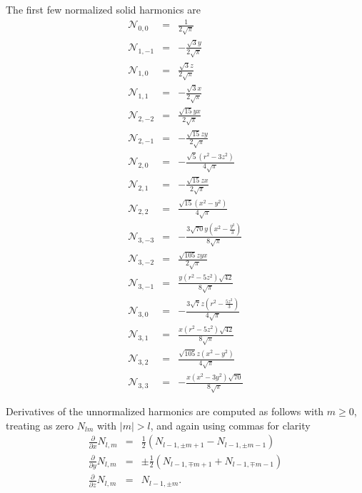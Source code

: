 \documentclass[12pt]{article}
\newcommand{\N}{\mathcal{N}}
\begin{document}
The first few normalized solid harmonics are
\begin{eqnarray}
\N_{0, 0} & = &  \frac{1}{2 \sqrt{\pi}}  \nonumber \\
\N_{1, -1} & = &  -\frac{\sqrt{3} y}{2 \sqrt{\pi}} \nonumber \\
\N_{1, 0} & = &  \frac{\sqrt{3} z}{2 \sqrt{\pi}} \nonumber \\
\N_{1, 1} & = &  -\frac{\sqrt{3} x}{2 \sqrt{\pi}} \nonumber \\
\N_{2, -2} & = &  \frac{\sqrt{15} y x}{2 \sqrt{\pi}} \nonumber \\
\N_{2, -1} & = &  -\frac{\sqrt{15} z y}{2 \sqrt{\pi}} \nonumber \\
\N_{2, 0} & = &  -\frac{\sqrt{5} \left(r^{2}-3 z^{2}\right)}{4 \sqrt{\pi}} \nonumber \\
\N_{2, 1} & = &  -\frac{\sqrt{15} z x}{2 \sqrt{\pi}} \nonumber \\
\N_{2, 2} & = &  \frac{\sqrt{15} \left(x^{2}-y^{2}\right)}{4 \sqrt{\pi}} \nonumber \\
\N_{3, -3} & = &  -\frac{3 \sqrt{70} y \left(x^{2}-\frac{y^{2}}{3}\right)}{8 \sqrt{\pi}} \nonumber \\
\N_{3, -2} & = &  \frac{\sqrt{105} z y x}{2 \sqrt{\pi}} \nonumber \\
\N_{3, -1} & = &  \frac{y \left(r^{2}-5 z^{2}\right) \sqrt{42}}{8 \sqrt{\pi}} \nonumber \\
\N_{3, 0} & = &  -\frac{3 \sqrt{7} z \left(r^{2}-\frac{5 z^{2}}{3}\right)}{4 \sqrt{\pi}}  \nonumber \\
\N_{3, 1} & = &  \frac{x \left(r^{2}-5 z^{2}\right) \sqrt{42}}{8 \sqrt{\pi}} \nonumber \\
\N_{3, 2} & = &  \frac{\sqrt{105} z \left(x^{2}-y^{2}\right)}{4 \sqrt{\pi}} \nonumber \\
\N_{3, 3} & = &  -\frac{x \left(x^{2}-3 y^{2}\right) \sqrt{70}}{8 \sqrt{\pi}} \nonumber
\end{eqnarray}

Derivatives of the unnormalized harmonics are computed as follows with $m\ge 0$, treating as zero $N_{lm}$ with $|m|>l$, and again using commas for clarity
\begin{eqnarray}
  \frac{\partial}{\partial x} N_{l,m} & = & \frac{1}{2}\left( N_{l-1,\pm m+1} - N_{l-1,\pm m-1} \right) \nonumber \\
  \frac{\partial}{\partial y} N_{l,m} & = & \pm \frac{1}{2}\left( N_{l-1,\mp m+1} + N_{l-1,\mp m-1} \right) \nonumber \\
  \frac{\partial}{\partial z} N_{l,m} & = & N_{l-1,\pm m} . \nonumber
\end{eqnarray}
 
\end{document}
